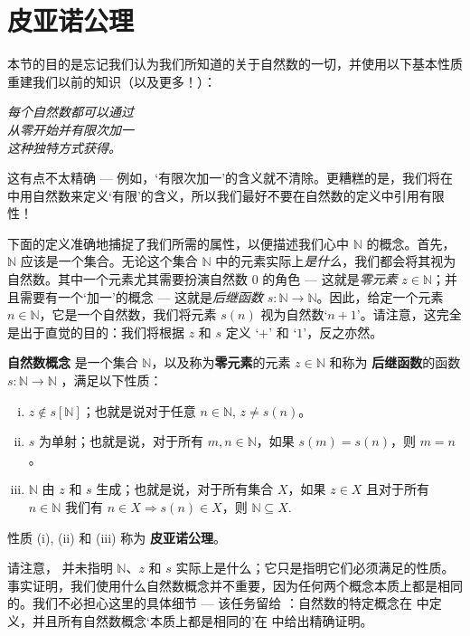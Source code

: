 \section{皮亚诺公理}

本节的目的是忘记我们认为我们所知道的关于自然数的一切，并使用以下基本性质重建我们以前的知识（以及更多！）：

\begin{center}
\textit{每个自然数都可以通过\\从零开始并有限次加一\\这种独特方式获得。}
\end{center}

这有点不太精确 --- 例如，`有限次加一'的含义就不清除。更糟糕的是，我们将在  中用自然数来定义`有限'的含义，所以我们最好不要在自然数的定义中引用有限性！

下面的定义准确地捕捉了我们所需的属性，以便描述我们心中 $\mathbb{N}$ 的概念。首先，$\mathbb{N}$ 应该是一个集合。无论这个集合 $\mathbb{N}$ 中的元素实际上\textit{是什么}，我们都会将其视为自然数。其中一个元素尤其需要扮演自然数 $0$ 的角色 --- 这就是\textit{零元素} $z \in \mathbb{N}$；并且需要有一个`加一'的概念 --- 这就是\textit{后继函数} $s : \mathbb{N} \to \mathbb{N}$。因此，给定一个元素 $n \in \mathbb{N}$，它是一个自然数，我们将元素 $s(n)$ 视为自然数`$n+1$'。请注意，这完全是出于直觉的目的：我们将根据 $z$ 和 $s$ 定义 `$+$' 和 `$1$'，反之亦然。

\begin{definition}
\label{defNotionOfNaturalNumbers}
\textbf{自然数概念} 是一个集合 $\mathbb{N}$，以及称为\textbf{零元素}的元素 $z \in \mathbb{N}$ 和称为 \textbf{后继函数}的函数 $s : \mathbb{N} \to \mathbb{N}$ ，满足以下性质：
\begin{enumerate}[(i)]
\item $z \not\in s[\mathbb{N}]$；也就是说对于任意 $n \in \mathbb{N}$, $z \ne s(n)$。
\item $s$ 为单射；也就是说，对于所有 $m,n \in \mathbb{N}$，如果 $s(m) = s(n)$，则 $m=n$。
\item $\mathbb{N}$ 由 $z$ 和 $s$ 生成；也就是说，对于所有集合 $X$，如果 $z \in X$ 且对于所有 $n \in \mathbb{N}$ 我们有 $n \in X \Rightarrow s(n) \in X$，则 $\mathbb{N} \subseteq X$.
\end{enumerate}
性质 (i), (ii) 和 (iii) 称为 \textbf{皮亚诺公理}。
\end{definition}

请注意， 并未指明 $\mathbb{N}$、$z$ 和 $s$ 实际上是什么；它只是指明它们必须满足的性质。事实证明，我们使用什么自然数概念并不重要，因为任何两个概念本质上都是相同的。我们不必担心这里的具体细节 --- 该任务留给 ：自然数的特定概念在  中定义，并且所有自然数概念`本质上都是相同的'在  中给出精确证明。

